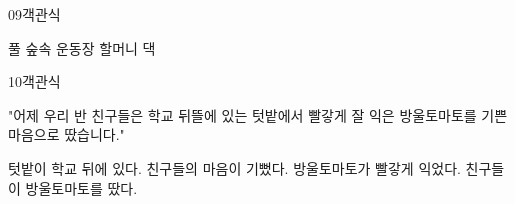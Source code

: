 \documentclass[fs13,seriesSau]{korfarm-base}
\begin{document}
\begin{kfQBlock}{09}{객관식}
\begin{kfChoices}
\kfChoice 풀
\kfChoice 숲속
\kfChoice 운동장
\kfChoice 할머니 댁
\end{kfChoices}
\end{kfQBlock}

\begin{kfQBlock}{10}{객관식}
\begin{kfEvidence}"어제 우리 반 친구들은 학교 뒤뜰에 있는 텃밭에서 빨갛게 잘 익은 방울토마토를 기쁜 마음으로 땄습니다."\end{kfEvidence}
\begin{kfChoices}
\kfChoice 텃밭이 학교 뒤에 있다.
\kfChoice 친구들의 마음이 기뻤다.
\kfChoice 방울토마토가 빨갛게 익었다.
\kfChoice 친구들이 방울토마토를 땄다.
\end{kfChoices}
\end{kfQBlock}
\end{document}
